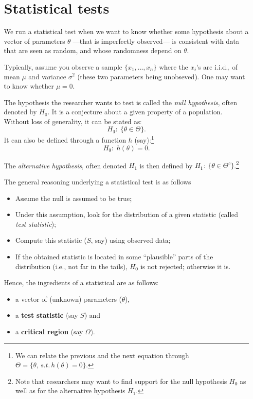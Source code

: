 \documentclass[
  12pt,
]{book}
\providecommand{\tightlist}{%
  \setlength{\itemsep}{0pt}\setlength{\parskip}{0pt}}
\theoremstyle{definition}
\theoremstyle{definition}
\theoremstyle{definition}
\theoremstyle{definition}
\theoremstyle{remark}
\begin{document}
\hypertarget{Tests}{%
\chapter{Statistical tests}\label{Tests}}

We run a statistical test when we want to know whether some hypothesis about a vector of parameters \(\theta\) ---that is imperfectly observed--- is consistent with data that are seen as random, and whose randomness depend on \(\theta\).

Typically, assume you observe a sample \(\{x_1,\dots,x_n\}\) where the \(x_i\)'s are i.i.d., of mean \(\mu\) and variance \(\sigma^2\) (these two parameters being unobseved). One may want to know whether \(\mu=0\).

The hypothesis the researcher wants to test is called the \emph{null hypothesis}, often denoted by \(H_0\). It is a conjecture about a given property of a population. Without loss of generality, it can be stated as:
\[
H_0:\;\{\theta \in \Theta\}.
\]
It can also be defined through a function \(h\) (say):\footnote{We can relate the previous and the next equation through \(\Theta = \{\theta, \,s.t.\,h(\theta)=0\}\).}
\[
H_0:\;h(\theta)=0.
\]

The \emph{alternative hypothesis}, often denoted \(H_1\) is then defined by \(H_1:\;\{\theta \in \Theta^c\}\).\footnote{Note that researchers may want to find support for the null hypothesis \(H_0\) as well as for the alternative hypothesis \(H_1\).}

The general reasoning underlying a statistical test is as follows

\begin{itemize}
\tightlist
\item
  Assume the null is assumed to be true;
\item
  Under this assumption, look for the distribution of a given statistic (called \emph{test statistic});
\item
  Compute this statistic (\(S\), say) using observed data;
\item
  If the obtained statistic is located in some ``plausible'' parts of the distribution (i.e., not far in the tails), \(H_0\) is not rejected; otherwise it is.
\end{itemize}

Hence, the ingredients of a statistical are as follows:

\begin{itemize}
\tightlist
\item
  a vector of (unknown) parameters (\(\theta\)),
\item
  a \textbf{test statistic} (say \(S\)) and
\item
  a \textbf{critical region} (say \(\Omega\)).
\end{itemize}
\end{document}
